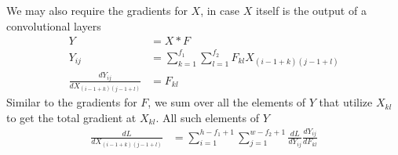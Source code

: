 \documentclass[../../deep_learning_notes.tex]{subfiles}
\begin{document}
We may also require the gradients for $X$, in case $X$ itself is the output of a convolutional layers
\begin{align*}
    Y &= X * F\\
    Y_{ij} &= \sum_{k=1}^{f_{1}} \sum_{l=1}^{f_{2}} F_{kl} X_{(i-1+k)(j-1+l)}\\
    \frac{dY_{ij}}{dX_{(i-1+k)(j-1+l)}} &= F_{kl}
\end{align*}
Similar to the gradients for $F$, we sum over all the elements of $Y$ that utilize $X_{kl}$ to get the total gradient at $X_{kl}$. All such elements of $Y$ 
\begin{align*}
    \frac{dL}{dX_{(i-1+k)(j-1+l)}} &= \sum_{i=1}^{h - f_{1} + 1} \sum_{j=1}^{w - f_{2} + 1} \frac{dL}{dY_{ij}} \frac{dY_{ij}}{dF_{kl}}
\end{align*}
\end{document}

